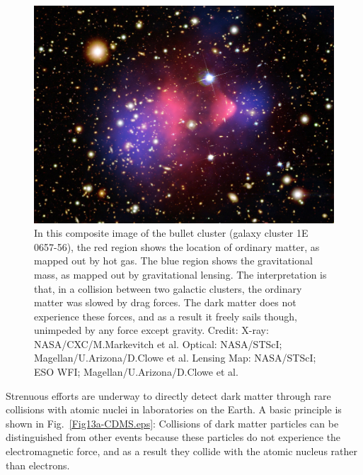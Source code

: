 \documentclass[12pt]{iopart}
\begin{document}
\begin{figure}[htbp]
\centering
 \includegraphics[bb=0 0 360 270, width=5in]{Fig12-bulletcluster.eps}
 \caption{In this composite image of the bullet cluster (galaxy cluster 1E 0657-56), the red region shows the location of ordinary matter, as mapped out by hot gas. The blue region shows the gravitational mass, as mapped out by gravitational lensing. The interpretation is that, in a collision between two galactic clusters, the ordinary matter was slowed by drag forces. The dark matter does not experience these forces, and as a result it freely sails though, unimpeded by any force except gravity. Credit: X-ray: NASA/CXC/M.Markevitch et al. Optical: NASA/STScI; Magellan/U.Arizona/D.Clowe et al. Lensing Map: NASA/STScI; ESO WFI; Magellan/U.Arizona/D.Clowe et al. \label{Fig12-bulletcluster.eps}}
\end{figure}

Strenuous efforts are underway to directly detect dark matter through rare collisions with atomic nuclei in laboratories on the Earth. A basic  principle is shown in Fig.~\ref{Fig13a-CDMS.eps}: Collisions of dark matter particles can be distinguished from other events because these particles  do not experience the electromagnetic force, and as a result they collide with the atomic nucleus rather than electrons. 
\end{document}
